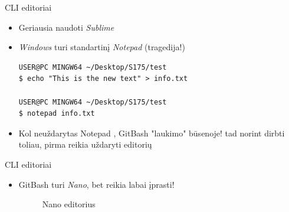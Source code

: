 \documentclass[11pt,xcolor=table]{beamer}
\begin{document}
\begin{frame}[fragile]{CLI editoriai}
\begin{itemize}
\item Geriausia naudoti \textit{Sublime}
\item \textit{Windows} turi standartinį \textit{Notepad} (tragedija!)
\begin{lstlisting}
USER@PC MINGW64 ~/Desktop/S175/test
$ echo "This is the new text" > info.txt

USER@PC MINGW64 ~/Desktop/S175/test
$ notepad info.txt
\end{lstlisting}
\item Kol neuždarytas Notepad , GitBash "laukimo" būsenoje! tad norint dirbti toliau, pirma reikia uždaryti editorių
\end{itemize}
\end{frame}


\begin{frame}[fragile]{CLI editoriai}
\begin{itemize}
\item GitBash turi \textit{Nano}, bet reikia labai įprasti!
\begin{figure}
\caption{Nano editorius}
\end{figure}
\end{itemize}
\end{frame}

\end{document}

